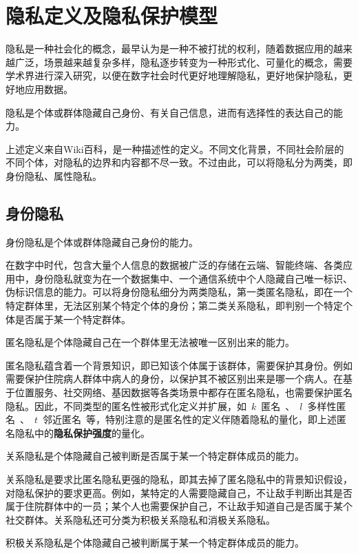 \section{隐私定义及隐私保护模型}
隐私是一种社会化的概念，最早认为是一种不被打扰的权利，随着数据应用的越来越广泛，场景越来越复杂多样，隐私逐步转变为一种形式化、可量化的概念，需要学术界进行深入研究，以便在数字社会时代更好地理解隐私，更好地保护隐私，更好地应用数据。

\begin{definition}\label{def:privacy}
	隐私是个体或群体隐藏自己身份、有关自己信息，进而有选择性的表达自己的能力。
\end{definition}

上述定义来自Wiki百科，是一种描述性的定义。不同文化背景，不同社会阶层的不同个体，对隐私的边界和内容都不尽一致。不过由此，可以将隐私分为两类，即身份隐私、属性隐私。

\subsection{身份隐私}
\begin{definition}
身份隐私是个体或群体隐藏自己身份的能力。
\end{definition}

在数字中时代，包含大量个人信息的数据被广泛的存储在云端、智能终端、各类应用中，身份隐私就变为在一个数据集中、一个通信系统中个人隐藏自己唯一标识、伪标识信息的能力。可以将身份隐私细分为两类隐私，第一类匿名隐私，即在一个特定群体里，无法区别某个特定个体的身份；第二类关系隐私，即判别一个特定个体是否属于某一个特定群体。
\begin{definition}
	匿名隐私是个体隐藏自己在一个群体里无法被唯一区别出来的能力。
\end{definition}

匿名隐私蕴含着一个背景知识，即已知该个体属于该群体，需要保护其身份。例如需要保护住院病人群体中病人的身份，以保护其不被区别出来是哪一个病人。在基于位置服务、社交网络、基因数据等各类场景中都存在匿名隐私，也需要保护匿名隐私。因此，不同类型的匿名性被形式化定义并扩展，如~$k$~匿名~\cite{sweeney2002k}、~$l$~多样性匿名~\cite{machanavajjhala2007l}、~$t$~邻近匿名~\cite{li2007t}等，特别注意的是匿名性的定义伴随着隐私的量化，即上述匿名隐私中的\textbf{隐私保护强度}的量化。

\begin{definition}
	关系隐私是个体隐藏自己被判断是否属于某一个特定群体成员的能力。
\end{definition}

关系隐私是要求比匿名隐私更强的隐私，即其去掉了匿名隐私中的背景知识假设，对隐私保护的要求更高。例如，某特定的人需要隐藏自己，不让敌手判断出其是否属于住院群体中的一员；某个人也需要保护自己，不让敌手知道自己是否属于某个社交群体。关系隐私还可分类为积极关系隐私和消极关系隐私。
\begin{definition}
	积极关系隐私是个体隐藏自己被判断属于某一个特定群体成员的能力。
\end{definition}

